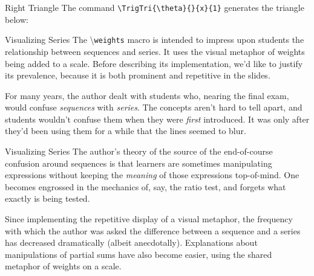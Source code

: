 \documentclass[10pt]{beamer}
\begin{document}
\begin{frame}[fragile]{Right Triangle}
The command \verb|\TrigTri{\theta}{}{x}{1}| generates the triangle below:
\vfill
{}

\end{frame}
\begin{frame}{Visualizing Series}
The \textbackslash\texttt{weights} macro is intended to impress upon students the relationship between sequences and series. It uses the visual metaphor of weights being added to a scale. Before describing its implementation, we'd like to justify its prevalence, because it is both prominent and repetitive in the slides.
\vfill

For many years, the author dealt with students who, nearing the final exam, would confuse \textit{sequences} with \textit{series}. The concepts aren't hard to tell apart, and students wouldn't confuse them when they were \textit{first} introduced. It was only after they'd been using them for a while that the lines seemed to blur. \vfill

\end{frame}

\begin{frame}{Visualizing Series}
The author's theory of the source of the end-of-course confusion around sequences is that learners are sometimes manipulating expressions without keeping the \textit{meaning} of those expressions top-of-mind. One becomes engrossed in the mechanics of, say, the ratio test, and forgets what exactly is being tested.\vfill

Since implementing the repetitive display of a visual metaphor, the frequency with which the author was asked the difference between a sequence and a series has decreased dramatically (albeit anecdotally). Explanations about manipulations of partial sums have also become easier, using the shared metaphor of weights on a scale.
\end{frame}
\end{document}
